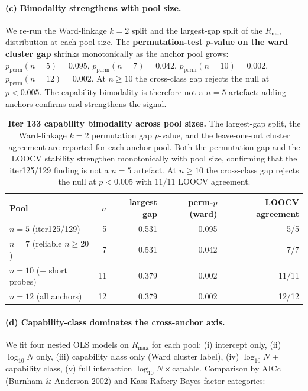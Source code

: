 \paragraph{(c) Bimodality strengthens with pool size.}
\label{par:scaling-iter133-bimod}
We re-run the Ward-linkage $k=2$ split and the largest-gap split
of the $R_{\max}$ distribution at each pool size.  The
\textbf{permutation-test $p$-value on the ward cluster gap}
shrinks monotonically as the anchor pool grows:
$p_{\text{perm}}(n=5) = 0.095$,
$p_{\text{perm}}(n=7) = 0.042$,
$p_{\text{perm}}(n=10) = 0.002$,
$p_{\text{perm}}(n=12) = 0.002$.
At $n \ge 10$ the cross-class gap rejects the null at
$p < 0.005$.  The capability bimodality is therefore not a
$n = 5$ artefact: adding anchors confirms and strengthens the
signal.

\begin{table}[t]
  \centering
  \small
  \begin{tabular}{lrrrr}
    \toprule
    Pool & $n$ & largest gap & perm-$p$(ward) & LOOCV agreement \\
    \midrule
    $n=5$ (iter125/129)        &  5 & 0.531 & 0.095 & 5/5   \\
    $n=7$ (reliable $n \ge 20$)&  7 & 0.531 & 0.042 & 7/7   \\
    $n=10$ (+ short probes)    & 11 & 0.379 & 0.002 & 11/11 \\
    $n=12$ (all anchors)       & 12 & 0.379 & 0.002 & 12/12 \\
    \bottomrule
  \end{tabular}
  \caption{\textbf{Iter 133 capability bimodality across pool sizes.}
    The largest-gap split, the Ward-linkage $k=2$ permutation gap
    $p$-value, and the leave-one-out cluster agreement are reported
    for each anchor pool.  Both the permutation gap and the LOOCV
    stability strengthen monotonically with pool size, confirming
    that the iter125/129 finding is not a $n = 5$ artefact.  At
    $n \ge 10$ the cross-class gap rejects the null at $p < 0.005$
    with $11/11$ LOOCV agreement.}
  \label{tab:scaling-iter133-bimod}
\end{table}

\paragraph{(d) Capability-class dominates the cross-anchor axis.}
\label{par:scaling-iter133-class}
We fit four nested OLS models on $R_{\max}$ for each pool: (i)
intercept only, (ii) $\log_{10} N$ only, (iii) capability class
only (Ward cluster label), (iv) $\log_{10} N$ + capability class,
(v) full interaction $\log_{10} N \times \text{capable}$.
Comparison by AICc (Burnham \& Anderson 2002) and Kass-Raftery
Bayes factor categories:

